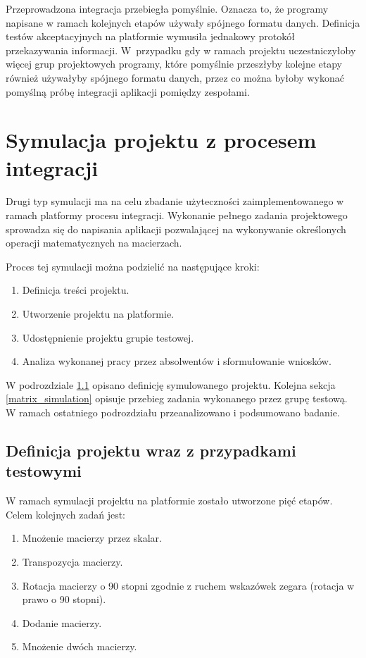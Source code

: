 Przeprowadzona integracja przebiegła pomyślnie.
Oznacza to, że programy napisane w ramach kolejnych etapów używały spójnego formatu danych.
Definicja testów akceptacyjnych na platformie wymusiła jednakowy protokół przekazywania informacji.
W~przypadku gdy w ramach projektu uczestniczyłoby więcej grup projektowych programy, które pomyślnie przeszłyby kolejne etapy również używałyby spójnego formatu danych, przez co można byłoby wykonać pomyślną próbę integracji aplikacji pomiędzy zespołami.

\section{Symulacja projektu z procesem integracji}
\label{research_matrix}

Drugi typ symulacji ma na celu zbadanie użyteczności zaimplementowanego w ramach platformy procesu integracji.
Wykonanie pełnego zadania projektowego sprowadza się do napisania aplikacji pozwalającej na wykonywanie określonych operacji matematycznych na macierzach.

Proces tej symulacji można podzielić na następujące kroki:
\begin{enumerate}
    \item Definicja treści projektu.
    \item Utworzenie projektu na platformie.
    \item Udostępnienie projektu grupie testowej.
    \item Analiza wykonanej pracy przez absolwentów i sformułowanie wniosków.
\end{enumerate}

W podrozdziale \ref{matrix_project_definition} opisano definicję symulowanego projektu.
Kolejna sekcja \ref{matrix_simulation} opisuje przebieg zadania wykonanego przez grupę testową.
W ramach ostatniego podrozdziału przeanalizowano i podsumowano badanie.


\subsection{Definicja projektu wraz z przypadkami testowymi}
\label{matrix_project_definition}

W ramach symulacji projektu na platformie zostało utworzone pięć etapów.
Celem kolejnych zadań jest:
\begin{enumerate}
    \item Mnożenie macierzy przez skalar.
    \item Transpozycja macierzy.
    \item Rotacja macierzy o 90 stopni zgodnie z ruchem wskazówek zegara (rotacja w prawo o 90 stopni).
    \item Dodanie macierzy.
    \item Mnożenie dwóch macierzy.
\end{enumerate}

